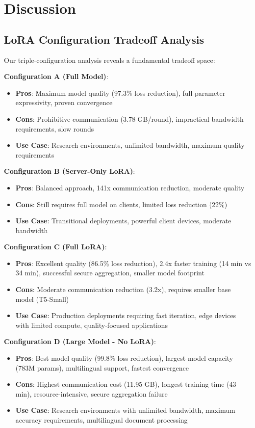\documentclass[conference]{IEEEtran}
\begin{document}
\section{Discussion}

\subsection{LoRA Configuration Tradeoff Analysis}

Our triple-configuration analysis reveals a fundamental tradeoff space:

\textbf{Configuration A (Full Model)}:
\begin{itemize}
    \item \textbf{Pros}: Maximum model quality (97.3\% loss reduction), full parameter expressivity, proven convergence
    \item \textbf{Cons}: Prohibitive communication (3.78 GB/round), impractical bandwidth requirements, slow rounds
    \item \textbf{Use Case}: Research environments, unlimited bandwidth, maximum quality requirements
\end{itemize}

\textbf{Configuration B (Server-Only LoRA)}:
\begin{itemize}
    \item \textbf{Pros}: Balanced approach, 141x communication reduction, moderate quality
    \item \textbf{Cons}: Still requires full model on clients, limited loss reduction (22\%)
    \item \textbf{Use Case}: Transitional deployments, powerful client devices, moderate bandwidth
\end{itemize}

\textbf{Configuration C (Full LoRA)}:
\begin{itemize}
    \item \textbf{Pros}: Excellent quality (86.5\% loss reduction), 2.4x faster training (14 min vs 34 min), successful secure aggregation, smaller model footprint
    \item \textbf{Cons}: Moderate communication reduction (3.2x), requires smaller base model (T5-Small)
    \item \textbf{Use Case}: Production deployments requiring fast iteration, edge devices with limited compute, quality-focused applications
\end{itemize}

\textbf{Configuration D (Large Model - No LoRA)}:
\begin{itemize}
    \item \textbf{Pros}: Best model quality (99.8\% loss reduction), largest model capacity (783M params), multilingual support, fastest convergence
    \item \textbf{Cons}: Highest communication cost (11.95 GB), longest training time (43 min), resource-intensive, secure aggregation failure
    \item \textbf{Use Case}: Research environments with unlimited bandwidth, maximum accuracy requirements, multilingual document processing
\end{itemize}
\end{document}

